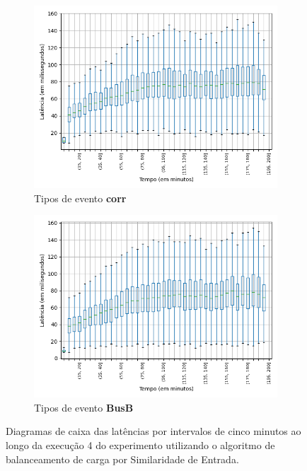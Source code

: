 \begin{figure}
\begin{subfigure}{.5\textwidth}
\centering
\includegraphics[width=\textwidth]{figuras/graphics/boxplot_9-dez-is_corr.png}
\caption{Tipos de evento \textbf{corr}}
\label{fig:BoxPlot_corr_IS_9-dez-is}
\end{subfigure}%
\begin{subfigure}{.5\textwidth}
\centering
\includegraphics[width=\textwidth]{figuras/graphics/boxplot_9-dez-is_busb.png}
\caption{Tipos de evento \textbf{BusB}}
\label{fig:BoxPlot_BusB_IS_9-dez-is}
\end{subfigure}%
\caption{Diagramas de caixa das latências por intervalos de cinco minutos ao longo da execução 4 do experimento utilizando o algoritmo de balanceamento de carga por Similaridade de Entrada.}
\end{figure}



